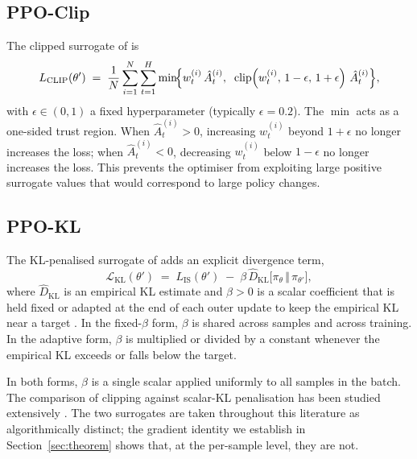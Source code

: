 \documentclass{article}
\begin{document}
\subsection{PPO-Clip}

The clipped surrogate of \citet{schulman2017ppo} is
\begin{equation}
L_{\mathrm{CLIP}}(\theta')
\;=\;
\frac{1}{N}\sum_{i=1}^{N}\sum_{t=1}^{H}
\min\!\Bigl\{
  w_t^{(i)}\,\hat{A}_t^{(i)},\;\;
  \mathrm{clip}\!\left(w_t^{(i)},\,1-\epsilon,\,1+\epsilon\right)\,
  \hat{A}_t^{(i)}
\Bigr\},
\label{eq:clip-obj}
\end{equation}
with $\epsilon \in (0,1)$ a fixed hyperparameter (typically
$\epsilon = 0.2$). The $\min$ acts as a one-sided trust region. When
$\hat{A}_t^{(i)} > 0$, increasing $w_t^{(i)}$ beyond $1+\epsilon$ no
longer increases the loss; when $\hat{A}_t^{(i)} < 0$, decreasing
$w_t^{(i)}$ below $1-\epsilon$ no longer increases the loss. This
prevents the optimiser from exploiting large positive surrogate
values that would correspond to large policy changes.

\subsection{PPO-KL}

The KL-penalised surrogate of \citet{schulman2017ppo} adds an
explicit divergence term,
\[
\mathcal{L}_{\mathrm{KL}}(\theta')
\;=\;
L_{\mathrm{IS}}(\theta')
\;-\;
\beta\,\widehat{D}_{\mathrm{KL}}\!\bigl[\pi_\theta \,\Vert\, \pi_{\theta'}\bigr],
\]
where $\widehat{D}_{\mathrm{KL}}$ is an empirical KL estimate and
$\beta > 0$ is a scalar coefficient that is held fixed or adapted at
the end of each outer update to keep the empirical KL near a target
\citep{schulman2017ppo, heess2017dppo}. In the fixed-$\beta$ form,
$\beta$ is shared across samples and across training. In the
adaptive form, $\beta$ is multiplied or divided by a constant
whenever the empirical KL exceeds or falls below the target.

In both forms, $\beta$ is a single scalar applied uniformly to all
samples in the batch. The comparison of clipping against scalar-KL
penalisation has been studied extensively
\citep{schulman2017ppo, engstrom2020implementation, ilyas2020closer,
andrychowicz2021matters, hsu2020revisiting, sun2022espo}. The two
surrogates are taken throughout this literature as algorithmically
distinct; the gradient identity we establish in
Section~\ref{sec:theorem} shows that, at the per-sample level, they
are not.
\end{document}
